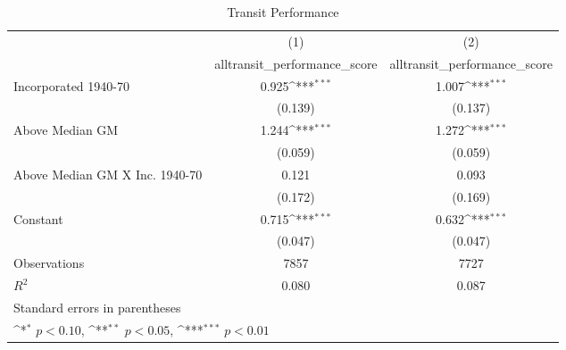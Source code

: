 \begin{table}[htbp]\centering
\def\sym#1{\ifmmode^{#1}\else\(^{#1}\)\fi}
\caption{Transit Performance}
\begin{tabular}{l*{2}{c}}
\hline\hline
                    &\multicolumn{1}{c}{(1)}&\multicolumn{1}{c}{(2)}\\
                    &\multicolumn{1}{c}{alltransit\_performance\_score}&\multicolumn{1}{c}{alltransit\_performance\_score}\\
\hline
Incorporated 1940-70&       0.925\sym{***}&       1.007\sym{***}\\
                    &     (0.139)         &     (0.137)         \\
[1em]
Above Median GM     &       1.244\sym{***}&       1.272\sym{***}\\
                    &     (0.059)         &     (0.059)         \\
[1em]
Above Median GM X Inc. 1940-70&       0.121         &       0.093         \\
                    &     (0.172)         &     (0.169)         \\
[1em]
Constant            &       0.715\sym{***}&       0.632\sym{***}\\
                    &     (0.047)         &     (0.047)         \\
\hline
Observations        &        7857         &        7727         \\
\(R^{2}\)           &       0.080         &       0.087         \\
\hline\hline
\multicolumn{3}{l}{\footnotesize Standard errors in parentheses}\\
\multicolumn{3}{l}{\footnotesize \sym{*} \(p<0.10\), \sym{**} \(p<0.05\), \sym{***} \(p<0.01\)}\\
\end{tabular}
\end{table}
